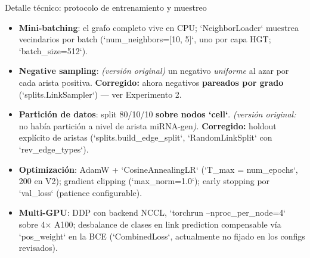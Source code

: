 \begin{frame}{Detalle t\'ecnico: protocolo de entrenamiento y muestreo}
  \small
  \begin{itemize}
    \item \textbf{Mini-batching}: el grafo completo vive en CPU; `NeighborLoader` muestrea vecindarios por batch (`num\_neighbors=[10, 5]`, uno por capa HGT; `batch\_size=512`).
    \item \textbf{Negative sampling}: \emph{(versi\'on original)} un negativo \emph{uniforme} al azar por cada arista positiva. \textbf{Corregido:} ahora negativos \textbf{pareados por grado} (`splits.LinkSampler`) --- ver Experimento 2.
    \item \textbf{Partici\'on de datos}: split 80/10/10 \textbf{sobre nodos `cell`}. \emph{(versi\'on original:} no hab\'ia partici\'on a nivel de arista miRNA-gen\emph{)}. \textbf{Corregido:} holdout expl\'icito de aristas (`splits.build\_edge\_split`, `RandomLinkSplit` con `rev\_edge\_types`).
    \item \textbf{Optimizaci\'on}: AdamW + `CosineAnnealingLR` (`T\_max = num\_epochs`, 200 en V2); gradient clipping (`max\_norm=1.0`); early stopping por `val\_loss` (patience configurable).
    \item \textbf{Multi-GPU}: DDP con backend NCCL, `torchrun --nproc\_per\_node=4` sobre 4$\times$ A100; desbalance de clases en link prediction compensable v\'ia `pos\_weight` en la BCE (`CombinedLoss`, actualmente no fijado en los configs revisados).
  \end{itemize}
\end{frame}

